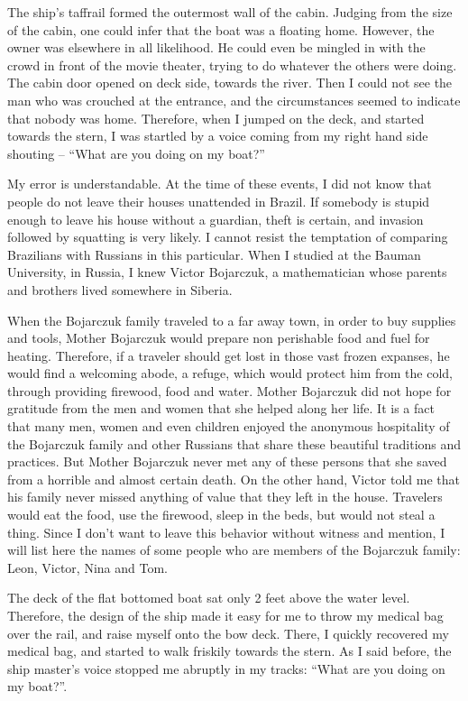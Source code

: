 \documentclass[
  12pt,
]{book}
\begin{document}
The ship's taffrail formed the outermost wall of the cabin. Judging from
the size of the cabin, one could infer that the boat was a floating
home. However, the owner was elsewhere in all likelihood. He could even
be mingled in with the crowd in front of the movie theater, trying to do
whatever the others were doing. The cabin door opened on deck side,
towards the river. Then I could not see the man who was crouched at the
entrance, and the circumstances seemed to indicate that nobody was home.
Therefore, when I jumped on the deck, and started towards the stern, I
was startled by a voice coming from my right hand side shouting --
``What are you doing on my boat?''

My error is understandable. At the time of these events, I did not know
that people do not leave their houses unattended in Brazil. If somebody
is stupid enough to leave his house without a guardian, theft is
certain, and invasion followed by squatting is very likely. I cannot
resist the temptation of comparing Brazilians with Russians in this
particular. When I studied at the Bauman University, in Russia, I knew
Victor Bojarczuk, a mathematician whose parents and brothers lived
somewhere in Siberia.

When the Bojarczuk family traveled to a far away town, in order to buy
supplies and tools, Mother Bojarczuk would prepare non perishable food
and fuel for heating. Therefore, if a traveler should get lost in those
vast frozen expanses, he would find a welcoming abode, a refuge, which
would protect him from the cold, through providing firewood, food and
water. Mother Bojarczuk did not hope for gratitude from the men and
women that she helped along her life. It is a fact that many men, women
and even children enjoyed the anonymous hospitality of the Bojarczuk
family and other Russians that share these beautiful traditions and
practices. But Mother Bojarczuk never met any of these persons that she
saved from a horrible and almost certain death. On the other hand,
Victor told me that his family never missed anything of value that they
left in the house. Travelers would eat the food, use the firewood, sleep
in the beds, but would not steal a thing. Since I don't want to leave
this behavior without witness and mention, I will list here the names of
some people who are members of the Bojarczuk family: Leon, Victor, Nina
and Tom.

The deck of the flat bottomed boat sat only 2 feet above the water
level. Therefore, the design of the ship made it easy for me to throw my
medical bag over the rail, and raise myself onto the bow deck. There, I
quickly recovered my medical bag, and started to walk friskily towards
the stern. As I said before, the ship master's voice stopped me abruptly
in my tracks: ``What are you doing on my boat?''.
\end{document}
